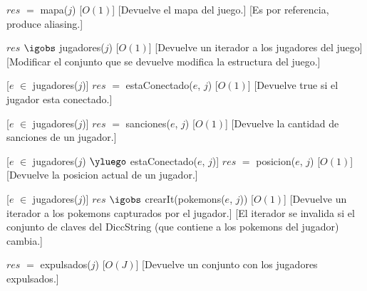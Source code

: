 \begin{Interfaz}

%
{$res$ $=$ mapa($j$)}%
[$O(1)$] %
[Devuelve el mapa del juego.]
[Es por referencia, produce aliasing.]


%
{$res$ $\igobs$ jugadores($j$)}%
[$O(1)$] %
[Devuelve un iterador a los jugadores del juego]
[Modificar el conjunto que se devuelve modifica la estructura del juego.]



%
[$e$ $\in$ jugadores($j$)]
{$res$ $=$ estaConectado($e$, $j$)}%
[$O(1)$] %
[Devuelve true si el jugador esta conectado.]



%
[$e$ $\in$ jugadores($j$)]
{$res$ $=$ sanciones($e$, $j$)}%
[$O(1)$] %
[Devuelve la cantidad de sanciones de un jugador.]



%
[$e$ $\in$ jugadores($j$)  $\yluego$ estaConectado($e$, $j$)]
{$res$ $=$ posicion($e$, $j$)}%
[$O(1)$] %
[Devuelve la posicion actual de un jugador.]



%
[$e$ $\in$ jugadores($j$)]
{$res$ $\igobs$ crearIt(pokemons($e$, $j$))}%
[$O(1)$] %
[Devuelve un iterador a los pokemons capturados por el jugador.]
[El iterador se invalida si el conjunto de claves del DiccString (que contiene a los pokemons del jugador) cambia.]



%
{$res$ $=$ expulsados($j$)}%
[$O(J)$]  
[Devuelve un conjunto con los jugadores expulsados.]



\end{Interfaz}
